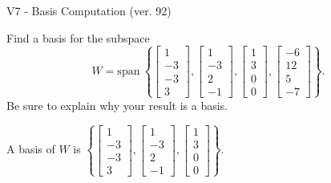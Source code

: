 \begin{exercise}
  \begin{exerciseTitle}V7 - Basis Computation (ver. 92)\end{exerciseTitle}
  \begin{exerciseStatement}
    Find a basis for the subspace 
\[W=\mathrm{span}\ \left\{\left[\begin{array}{r}
1 \\
-3 \\
-3 \\
3
\end{array}\right] , \left[\begin{array}{r}
1 \\
-3 \\
2 \\
-1
\end{array}\right] , \left[\begin{array}{r}
1 \\
3 \\
0 \\
0
\end{array}\right] , \left[\begin{array}{r}
-6 \\
12 \\
5 \\
-7
\end{array}\right]\right\}.\]
 Be sure to explain why your result is a basis.


  \end{exerciseStatement}
  \begin{exerciseAnswer}
   A basis of \(W\) is  \(\left\{\left[\begin{array}{r}
1 \\
-3 \\
-3 \\
3
\end{array}\right] , \left[\begin{array}{r}
1 \\
-3 \\
2 \\
-1
\end{array}\right] , \left[\begin{array}{r}
1 \\
3 \\
0 \\
0
\end{array}\right]\right\}\).
  


  \end{exerciseAnswer}
\end{exercise}